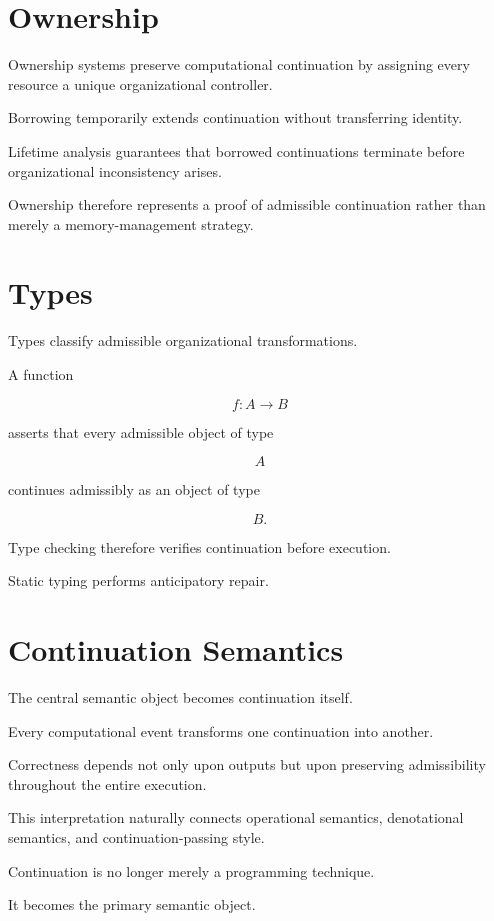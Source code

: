 \documentclass[11pt,oneside]{book}
\numberwithin{equation}{chapter}
\theoremstyle{definition}
\theoremstyle{plain}
\begin{document}
\section{Ownership}

Ownership systems preserve computational continuation by assigning every
resource a unique organizational controller.

Borrowing temporarily extends continuation without transferring identity.

Lifetime analysis guarantees that borrowed continuations terminate before
organizational inconsistency arises.

Ownership therefore represents a proof of admissible continuation rather
than merely a memory-management strategy.

\section{Types}

Types classify admissible organizational transformations.

A function

\[
f
:
A
\rightarrow
B
\]

asserts that every admissible object of type

\[
A
\]

continues admissibly as an object of type

\[
B.
\]

Type checking therefore verifies continuation before execution.

Static typing performs anticipatory repair.

\section{Continuation Semantics}

The central semantic object becomes continuation itself.

Every computational event transforms one continuation into another.

Correctness depends not only upon outputs but upon preserving
admissibility throughout the entire execution.

This interpretation naturally connects operational semantics,
denotational semantics, and continuation-passing style.

Continuation is no longer merely a programming technique.

It becomes the primary semantic object.
\end{document}
